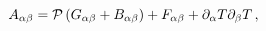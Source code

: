 \begin{equation}\label{A_definition}
A_{\alpha\beta} = {\cal{P}}\left(G_{\alpha\beta}+B_{\alpha\beta}
\right) +F_{\alpha\beta} +
\partial_{\alpha}T\partial_{\beta}T \, ,
\end{equation}

